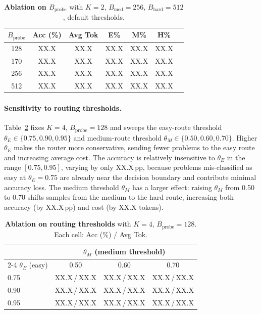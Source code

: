 \begin{table}[t]
\centering
\caption{%
  \textbf{Ablation on $B_{\mathrm{probe}}$} with $K = 2$,
  $B_{\mathrm{med}} = 256$, $B_{\mathrm{hard}} = 512$, default thresholds.
}
\label{tab:ablation-probe}
\small
\begin{tabular}{@{}ccccccc@{}}
\toprule
$B_{\mathrm{probe}}$ & \textbf{Acc (\%)} & \textbf{Avg Tok} &
  \textbf{E\%} & \textbf{M\%} & \textbf{H\%} \\
\midrule
128 & XX.X & XX.X & XX.X & XX.X & XX.X \\
170 & XX.X & XX.X & XX.X & XX.X & XX.X \\
256 & XX.X & XX.X & XX.X & XX.X & XX.X \\
512 & XX.X & XX.X & XX.X & XX.X & XX.X \\
\bottomrule
\end{tabular}
\end{table}

\paragraph{Sensitivity to routing thresholds.}
Table~\ref{tab:ablation-thresh} fixes $K = 4$, $B_{\mathrm{probe}} = 128$
and sweeps the easy-route threshold
$\theta_E \in \{0.75, 0.90, 0.95\}$ and medium-route threshold
$\theta_M \in \{0.50, 0.60, 0.70\}$.
Higher $\theta_E$ makes the router more conservative, sending fewer
problems to the easy route and increasing average cost.
The accuracy is relatively insensitive to $\theta_E$ in the range
$[0.75, 0.95]$, varying by only XX.X\,pp, because problems
mis-classified as easy at $\theta_E = 0.75$ are already near the
decision boundary and contribute minimal accuracy loss.
The medium threshold $\theta_M$ has a larger effect: raising $\theta_M$
from 0.50 to 0.70 shifts samples from the medium to the hard route,
increasing both accuracy (by XX.X\,pp) and cost (by XX.X tokens).

\begin{table}[t]
\centering
\caption{%
  \textbf{Ablation on routing thresholds} with $K = 4$,
  $B_{\mathrm{probe}} = 128$. Each cell: Acc (\%) / Avg Tok.
}
\label{tab:ablation-thresh}
\small
\begin{tabular}{@{}lccc@{}}
\toprule
& \multicolumn{3}{c}{$\theta_M$ (medium threshold)} \\
\cmidrule(lr){2-4}
$\theta_E$ (easy) & 0.50 & 0.60 & 0.70 \\
\midrule
0.75 & XX.X\,/\,XX.X & XX.X\,/\,XX.X & XX.X\,/\,XX.X \\
0.90 & XX.X\,/\,XX.X & XX.X\,/\,XX.X & XX.X\,/\,XX.X \\
0.95 & XX.X\,/\,XX.X & XX.X\,/\,XX.X & XX.X\,/\,XX.X \\
\bottomrule
\end{tabular}
\end{table}

